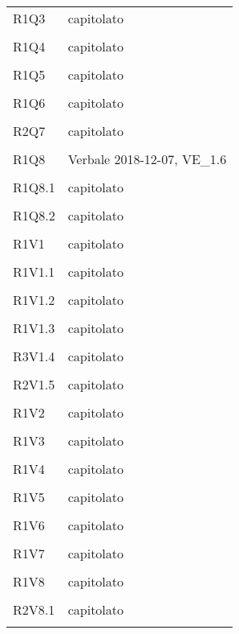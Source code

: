 \documentclass[a4paper]{article}
\begin{document}
\begin{longtable}{ >{\centering}p{}
		>{\centering}p{}}
	R1Q3 & capitolato\\\tabularnewline
	
	R1Q4 & capitolato\\\tabularnewline
	
	R1Q5 & capitolato\\\tabularnewline
	
	R1Q6 & capitolato\\\tabularnewline
	
	R2Q7 & capitolato\\\tabularnewline
	
	R1Q8 & Verbale 2018-12-07, VE_1.6\\\tabularnewline
	
	R1Q8.1 & capitolato\\\tabularnewline
	
	R1Q8.2 & capitolato\\\tabularnewline
	
	R1V1 & capitolato\\\tabularnewline
	
	R1V1.1 & capitolato\\\tabularnewline
	
	R1V1.2 & capitolato\\\tabularnewline
	
	R1V1.3 & capitolato\\\tabularnewline
	
	R3V1.4 & capitolato\\\tabularnewline
	
	R2V1.5 & capitolato\\\tabularnewline
	
	R1V2 & capitolato\\\tabularnewline
	
	R1V3 & capitolato\\\tabularnewline
	
	R1V4 & capitolato\\\tabularnewline
	
	R1V5 & capitolato\\\tabularnewline
	
	R1V6 & capitolato\\\tabularnewline
	
	R1V7 & capitolato\\\tabularnewline
	
	R1V8 & capitolato\\\tabularnewline
	
	R2V8.1 & capitolato\\\tabularnewline
	

\end{longtable}
\end{document}
